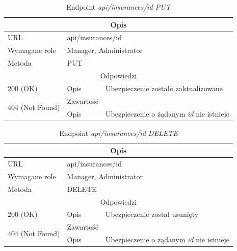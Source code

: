 \documentclass[eng,printmode,openany]{mgr}
\begin{document}
\begin{table}[H]
	\caption{Endpoint \textit{api/insurances/id PUT}}
	\begin{tabularx}{\textwidth}{|l|l|X|}
		\hline
		\multicolumn{3}{|c|}{Opis}
		\\ \hline
		URL                       & \multicolumn{2}{l|}{api/insurances/id}
		\\ \hline
		Wymagane role             & \multicolumn{2}{l|}{Manager, Administrator}
		\\ \hline
		Metoda                    & \multicolumn{2}{l|}{PUT}
		\\ \hline
		\multicolumn{3}{|c|}{Odpowiedzi}
		\\ \hline
		200 (OK) 		                        & Opis      	& Ubezpieczenie zostało zaktualizowane
		\\ \hline
		\multirow{2}{*}{404 (Not Found)} 	    & Zawartość     & 
		\\ \cline{2-3}                          & Opis          & Ubezpieczenie o żądanym \textit{id} nie istnieje
		\\ \hline
	\end{tabularx}
\end{table}

\begin{table}[H]
	\caption{Endpoint \textit{api/insurances/id DELETE}}
	\begin{tabularx}{\textwidth}{|l|l|X|}
		\hline
		\multicolumn{3}{|c|}{Opis}
		\\ \hline
		URL                       & \multicolumn{2}{l|}{api/insurances/id}
		\\ \hline
		Wymagane role             & \multicolumn{2}{l|}{Manager, Administrator}
		\\ \hline
		Metoda                    & \multicolumn{2}{l|}{DELETE}
		\\ \hline
		\multicolumn{3}{|c|}{Odpowiedzi}
		\\ \hline
		200 (OK)			                & Opis         	& Ubezpieczenie został usunięty
		\\ \hline
		\multirow{2}{*}{404 (Not Found)} 	& Zawartość     & 
		\\ \cline{2-3}                      & Opis          & Ubezpieczenie o żądanym \textit{id} nie istnieje
		\\ \hline
	\end{tabularx}
\end{table}
\end{document}
